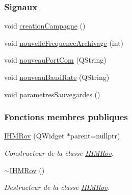 \subsubsection*{Signaux}
\begin{DoxyCompactItemize}
\item 
void \hyperlink{class_i_h_m_rov_a4a4a90ab6d074aa54466f3f87db2f81c}{creation\+Campagne} ()
\item 
void \hyperlink{class_i_h_m_rov_afcfb7f60c126fbaa87cb3f501189cc39}{nouvelle\+Frequence\+Archivage} (int)
\item 
void \hyperlink{class_i_h_m_rov_ae64280b18ebe069c1f64bd5f19ef3a2e}{nouveau\+Port\+Com} (Q\+String)
\item 
void \hyperlink{class_i_h_m_rov_a051d1d8d545e97c6b838df9054dddc6f}{nouveau\+Baud\+Rate} (Q\+String)
\item 
void \hyperlink{class_i_h_m_rov_accf04daf204c5810c8a6099bb7e37b7e}{parametres\+Sauvegardes} ()
\end{DoxyCompactItemize}
\subsubsection*{Fonctions membres publiques}
\begin{DoxyCompactItemize}
\item 
\hyperlink{class_i_h_m_rov_a5dac1fb4612866cc61f699a415e0ef6b}{I\+H\+M\+Rov} (Q\+Widget $\ast$parent=nullptr)
\begin{DoxyCompactList}\small\item\em Constructeur de la classe \hyperlink{class_i_h_m_rov}{I\+H\+M\+Rov}. \end{DoxyCompactList}\item 
\hyperlink{class_i_h_m_rov_ab861463889934a3b6083b7a29c6adf45}{$\sim$\+I\+H\+M\+Rov} ()
\begin{DoxyCompactList}\small\item\em Destructeur de la classe \hyperlink{class_i_h_m_rov}{I\+H\+M\+Rov}. \end{DoxyCompactList}\end{DoxyCompactItemize}
